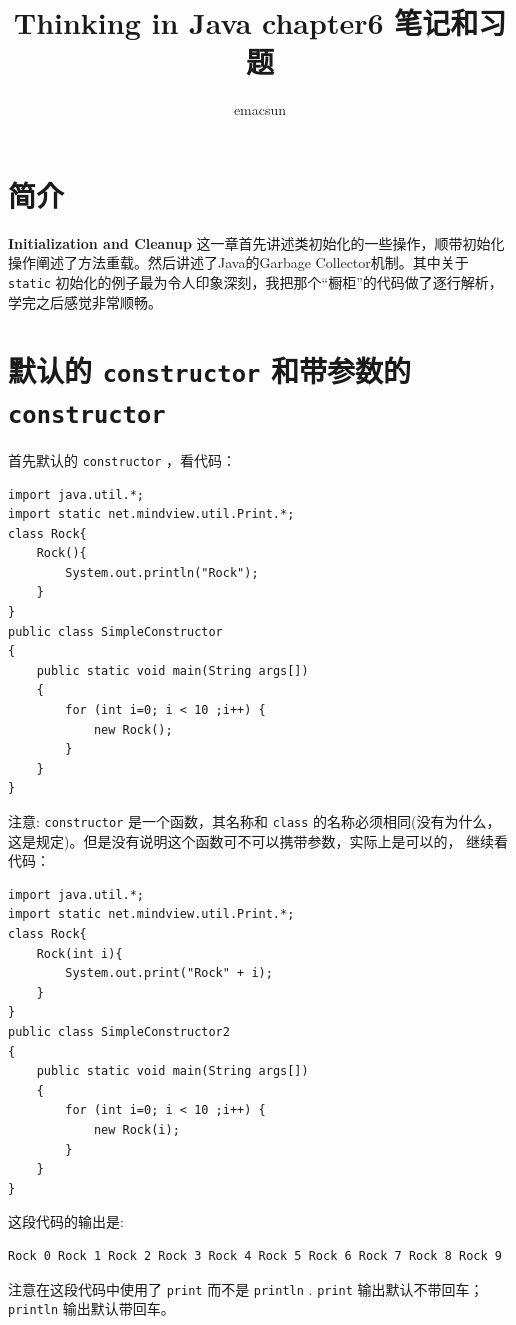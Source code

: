\documentclass[10pt,a4paper,UTF8]{article}
\author{emacsun}
\date{}
\title{Thinking in Java chapter6 笔记和习题}
\begin{document}
\maketitle
\tableofcontents
{}

\section{简介}
\label{sec:org439b762}
\textbf{Initialization and Cleanup} 这一章首先讲述类初始化的一些操作，顺带初始化操作阐述了方法重载。然后讲述了Java的Garbage Collector机制。其中关于 \texttt{static} 初始化的例子最为令人印象深刻，我把那个“橱柜”的代码做了逐行解析，学完之后感觉非常顺畅。

\section{默认的 \texttt{constructor} 和带参数的 \texttt{constructor}}
\label{sec:org273bd62}


首先默认的 \texttt{constructor} ，看代码：
\begin{verbatim}
import java.util.*;
import static net.mindview.util.Print.*;
class Rock{
    Rock(){
        System.out.println("Rock");
    }
}
public class SimpleConstructor
{
    public static void main(String args[])
    {
        for (int i=0; i < 10 ;i++) {
            new Rock();
        }
    }
}
\end{verbatim}

注意:  \texttt{constructor} 是一个函数，其名称和 \texttt{class} 的名称必须相同(没有为什么，这是规定)。但是没有说明这个函数可不可以携带参数，实际上是可以的， 继续看代码：
\begin{verbatim}
import java.util.*;
import static net.mindview.util.Print.*;
class Rock{
    Rock(int i){
        System.out.print("Rock" + i);
    }
}
public class SimpleConstructor2
{
    public static void main(String args[])
    {
        for (int i=0; i < 10 ;i++) {
            new Rock(i);
        }
    }
}
\end{verbatim}
这段代码的输出是:
\begin{verbatim}
Rock 0 Rock 1 Rock 2 Rock 3 Rock 4 Rock 5 Rock 6 Rock 7 Rock 8 Rock 9
\end{verbatim}
注意在这段代码中使用了 \texttt{print} 而不是 \texttt{println} . \texttt{print} 输出默认不带回车； \texttt{println} 输出默认带回车。
\end{document}
